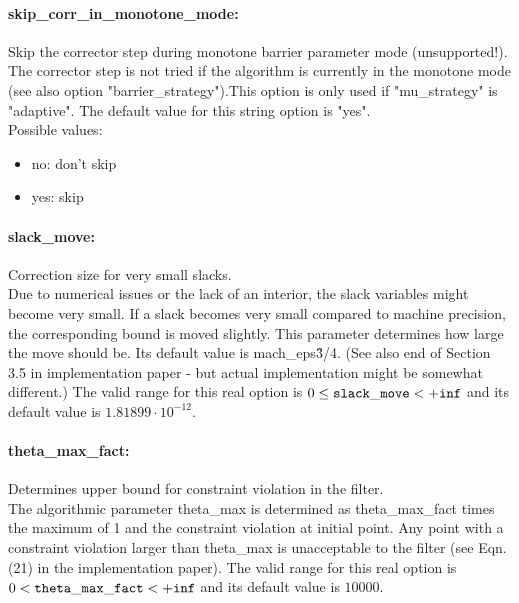 \paragraph{skip\_corr\_in\_monotone\_mode:}\label{sec:skip_corr_in_monotone_mode} Skip the corrector step during monotone barrier parameter mode (unsupported!). $\;$ \\
 The corrector step is not tried if the algorithm
is currently in the monotone mode (see also
option "barrier\_strategy").This option is only
used if "mu\_strategy" is "adaptive".
The default value for this string option is "yes".
\\ 
Possible values:
\begin{itemize}
   \item no: don't skip
   \item yes: skip
\end{itemize}

\paragraph{slack\_move:}\label{sec:slack_move} Correction size for very small slacks. $\;$ \\
 Due to numerical issues or the lack of an
interior, the slack variables might become very
small.  If a slack becomes very small compared to
machine precision, the corresponding bound is
moved slightly.  This parameter determines how
large the move should be.  Its default value is
mach\_eps\^{3/4}.  (See also end of Section 3.5
in implementation paper - but actual
implementation might be somewhat different.) The valid range for this real option is 
$0 \le {\tt slack\_move } <  {\tt +inf}$
and its default value is $1.81899 \cdot 10^{-12}$.


\paragraph{theta\_max\_fact:}\label{sec:theta_max_fact} Determines upper bound for constraint violation in the filter. $\;$ \\
 The algorithmic parameter theta\_max is
determined as theta\_max\_fact times the maximum
of 1 and the constraint violation at initial
point.  Any point with a constraint violation
larger than theta\_max is unacceptable to the
filter (see Eqn. (21) in the implementation
paper). The valid range for this real option is 
$0 <  {\tt theta\_max\_fact } <  {\tt +inf}$
and its default value is $10000$.


